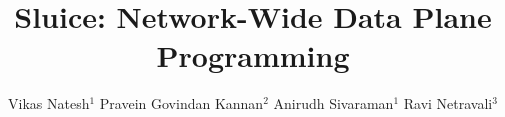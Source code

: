 \documentclass[sigconf]{acmart}
\begin{document}
\title{	Sluice: Network-Wide Data Plane Programming\vspace{-10mm}}


\author{Vikas Natesh$^{ 1}$ \space \space    Pravein Govindan Kannan$^{ 2}$  \space \space Anirudh Sivaraman$^{ 1}$  \space \space Ravi Netravali$^{ 3}$}

\renewcommand{\shortauthors}{V. Natesh. et al.}


\maketitle






\end{document}
